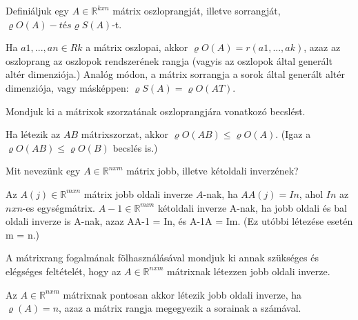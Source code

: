 \begin{frame}
  \begin{tcolorbox}[title={14}]
    Definiáljuk egy $A \in \mathbb{R}^{k x n}$ mátrix oszloprangját, illetve sorrangját, ${\varrho}O(A)-t és {\varrho}S(A)$-t.

  \tcblower
Ha $a1,...,an \in Rk$ a mátrix oszlopai, akkor ${\varrho}O(A) = r(a1,...,ak)$, azaz az oszloprang az oszlopok rendszerének rangja (vagyis az oszlopok által generált altér dimenziója.) Analóg módon, a mátrix sorrangja a sorok által generált altér dimenziója, vagy másképpen: ${\varrho}S(A) = {\varrho}O(AT)$.

  \end{tcolorbox}
\end{frame}

\begin{frame}
  \begin{tcolorbox}[title={15}]
   Mondjuk ki a mátrixok szorzatának oszloprangjára vonatkozó becslést.


  \tcblower
Ha létezik az $AB$ mátrixszorzat, akkor ${\varrho}O(AB) \leq {\varrho}O(A)$. (Igaz a ${\varrho}O(AB) \leq {\varrho}O(B)$ becslés is.)

  \end{tcolorbox}
\end{frame}


\begin{frame}
  \begin{tcolorbox}[title={16}]
     Mit nevezünk egy $A \in \mathbb{R}^{n x m}$ mátrix jobb, illetve kétoldali inverzének?

  \tcblower
Az $A(j) \in \mathbb{R}^{m x n}$ mátrix jobb oldali inverze $A$-nak, ha $AA(j) = In$, ahol $In$ az $n x n$-es egységmátrix. $A-1 \in \mathbb{R}^{m x n}$ kétoldali inverze A-nak, ha jobb oldali és bal oldali inverze is A-nak, azaz AA-1 = In, és A-1A = Im. (Ez utóbbi létezése esetén m = n.)

  \end{tcolorbox}
\end{frame}


\begin{frame}
  \begin{tcolorbox}[title={17}]
    A mátrixrang fogalmának fölhasználásával mondjuk ki annak szükséges és elégséges feltételét, hogy az $A \in \mathbb{R}^{n x m}$ mátrixnak létezzen jobb oldali inverze.

  \tcblower
Az $A \in \mathbb{R}^{n x m}$ mátrixnak pontosan akkor létezik jobb oldali inverze, ha ${\varrho}(A) = n$, azaz a mátrix rangja megegyezik a sorainak a számával.

  \end{tcolorbox}
\end{frame}



